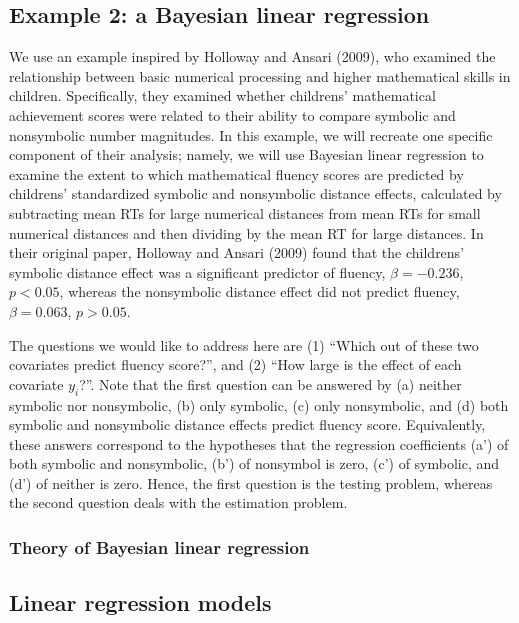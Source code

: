 \documentclass[english,,doc,floatsintext]{apa6}
\begin{document}
\hypertarget{example-2-a-bayesian-linear-regression}{%
\subsection{Example 2: a Bayesian linear regression}\label{example-2-a-bayesian-linear-regression}}

We use an example inspired by Holloway and Ansari (2009), who examined the relationship between basic numerical processing and higher mathematical skills in children. Specifically, they examined whether childrens' mathematical achievement scores were related to their ability to compare symbolic and nonsymbolic number magnitudes. In this example, we will recreate one specific component of their analysis; namely, we will use Bayesian linear regression to examine the extent to which mathematical fluency scores are predicted by childrens' standardized symbolic and nonsymbolic distance effects, calculated by subtracting mean RTs for large numerical distances from mean RTs for small numerical distances and then dividing by the mean RT for large distances.
In their original paper, Holloway and Ansari (2009) found that the childrens' symbolic distance effect was a significant predictor of fluency, \(\beta = -0.236\), \(p<0.05\), whereas the nonsymbolic distance effect did not predict fluency, \(\beta=0.063\), \(p>0.05\).

The questions we would like to address here are (1) \enquote{Which out of these two covariates predict fluency score?}, and (2) \enquote{How large is the effect of each covariate \(y_{i}\)?}. Note that the first question can be answered by (a) neither symbolic nor nonsymbolic, (b) only symbolic, (c) only nonsymbolic, and (d) both symbolic and nonsymbolic distance effects predict fluency score. Equivalently, these answers correspond to the hypotheses that the regression coefficients (a') of both symbolic and nonsymbolic, (b') of nonsymbol is zero, (c') of symbolic, and (d') of neither is zero. Hence, the first question is the testing problem, whereas the second question deals with the estimation problem.

\hypertarget{theory-of-bayesian-linear-regression}{%
\subsubsection{Theory of Bayesian linear regression}\label{theory-of-bayesian-linear-regression}}

\subsection{Linear regression models}
\end{document}
